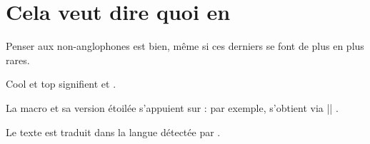 \documentclass[10pt, a4paper]{../main/main}
\begin{document}
\section{Cela veut dire quoi en }

Penser aux non-anglophones est bien, même si ces derniers se font de plus en plus rares.


\begin{tdoclatex}
Cool et top signifient  et .
\end{tdoclatex}


La macro  et sa version étoilée s'appuient sur  : par exemple,  s'obtient via \tdocinlatex|| .


\begin{tdocnote}
    Le texte  est traduit dans la langue détectée par \thisproj.
\end{tdocnote}
\end{document}
